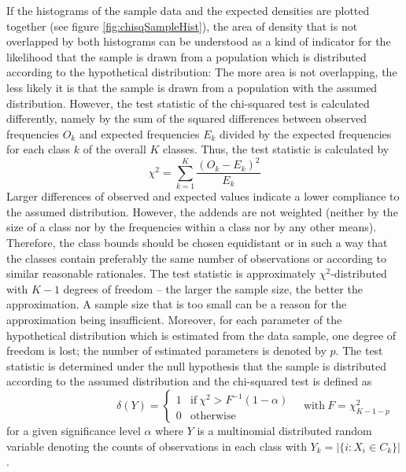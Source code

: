 \documentclass[a4paper, 12pt, titlepage, headsepline, listof = totoc, bibliography = totoc, numbers = noenddot]{scrartcl}
\begin{document}
If the histograms of the sample data and the expected densities are plotted together (see figure \ref{fig:chisqSampleHist}), the area of density that is not overlapped by both histograms can be understood as a kind of indicator for the likelihood that the sample is drawn from a population which is distributed according to the hypothetical distribution: The more area is not overlapping, the less likely it is that the sample is drawn from a population with the assumed distribution. However, the test statistic of the chi-squared test is calculated differently, namely by the sum of the squared differences between observed frequencies $O_k$ and expected frequencies $E_k$ divided by the expected frequencies for each class $k$ of the overall $K$ classes. Thus, the test statistic is calculated by
\[\chi^2 = \sum_{k=1}^{K}\frac{(O_k - E_k)^2}{E_k}\]
Larger differences of observed and expected values indicate a lower compliance to the assumed distribution. However, the addends are not weighted (neither by the size of a class nor by the frequencies within a class nor by any other means). Therefore, the class bounds should be chosen equidistant or in such a way that the classes contain preferably the same number of observations or according to similar reasonable rationales. The test statistic is approximately $\chi^2$-distributed with $K-1$ degrees of freedom -- the larger the sample size, the better the approximation. A sample size that is too small can be a reason for the approximation being insufficient. Moreover, for each parameter of the hypothetical distribution which is estimated from the data sample, one degree of freedom is lost; the number of estimated parameters is denoted by $p$. The test statistic is determined under the null hypothesis that the sample is distributed according to the assumed distribution and the chi-squared test is defined as
\[
  \phantom{\quad\mbox{with}\ F=\chi^2_{K-1-p}}
  \delta(Y) =
   \left\{ 
    \begin{array}{cll}
                 1 & \mbox{if} \ \chi^2 > F^{-1}(1-\alpha)\\
                 0 & \mbox{otherwise}
    \end{array} 
   \right.
   \quad\mbox{with}\ F=\chi^2_{K-1-p}
\]
for a given significance level $\alpha$ where $Y$ is a multinomial distributed random variable denoting the counts of observations in each class with $Y_k = |\{i : X_i \in C_k\}|$.
\end{document}
